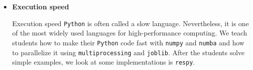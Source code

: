 \begin{itemize}
\item \textbf{Execution speed}

Execution speed \verb+Python+ is often called a slow language. Nevertheless, it is one of the most widely used languages for high-performance computing. We teach students how to make their \verb+Python+ code fast with \verb+numpy+ and \verb+numba+ and how to parallelize it using \verb+multiprocessing+ and \verb+joblib+. After the students solve simple examples, we look at some implementations is \verb+respy+.

\end{itemize}




\nocite{Gabler.2019}


